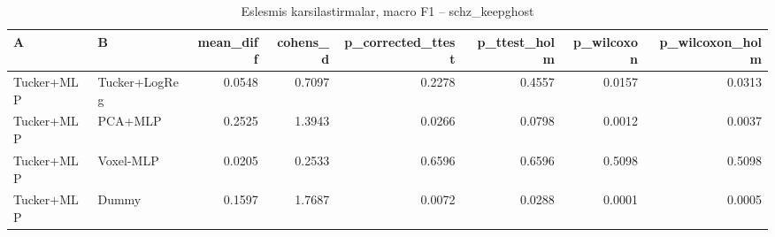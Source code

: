 \begin{table}[htbp]
  \centering
  \caption{Eslesmis karsilastirmalar, macro F1 -- schz\_keepghost}
  \label{tab:tests_schz_keepghost}
  \small
  \begin{tabular}{llrrrrrr}
    \toprule
    A & B & mean\_diff & cohens\_d & p\_corrected\_ttest & p\_ttest\_holm & p\_wilcoxon & p\_wilcoxon\_holm \\
    \midrule
    Tucker+MLP & Tucker+LogReg & 0.0548 & 0.7097 & 0.2278 & 0.4557 & 0.0157 & 0.0313 \\
    Tucker+MLP & PCA+MLP & 0.2525 & 1.3943 & 0.0266 & 0.0798 & 0.0012 & 0.0037 \\
    Tucker+MLP & Voxel-MLP & 0.0205 & 0.2533 & 0.6596 & 0.6596 & 0.5098 & 0.5098 \\
    Tucker+MLP & Dummy & 0.1597 & 1.7687 & 0.0072 & 0.0288 & 0.0001 & 0.0005 \\
    \bottomrule
  \end{tabular}
\end{table}
